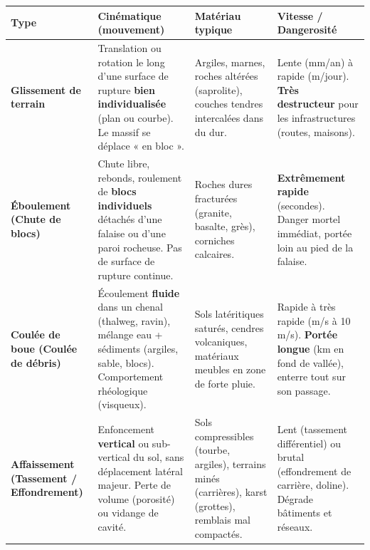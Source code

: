 \documentclass[11pt]{article}
\begin{document}
\begin{propriete}
\begin{center}
\begin{tabularx}{\linewidth}{|l|X|X|X|}\hline
\rowcolor{popblueL}
\textbf{Type} & \textbf{Cinématique (mouvement)} & \textbf{Matériau typique} & \textbf{Vitesse / Dangerosité} \\ \hline
\textbf{Glissement de terrain} & Translation ou rotation le long d'une surface de rupture \textbf{bien individualisée} (plan ou courbe). Le massif se déplace « en bloc ». & Argiles, marnes, roches altérées (saprolite), couches tendres intercalées dans du dur. & Lente (mm/an) à rapide (m/jour). \textbf{Très destructeur} pour les infrastructures (routes, maisons). \\ \hline
\textbf{Éboulement (Chute de blocs)} & Chute libre, rebonds, roulement de \textbf{blocs individuels} détachés d'une falaise ou d'une paroi rocheuse. Pas de surface de rupture continue. & Roches dures fracturées (granite, basalte, grès), corniches calcaires. & \textbf{Extrêmement rapide} (secondes). Danger mortel immédiat, portée loin au pied de la falaise. \\ \hline
\textbf{Coulée de boue (Coulée de débris)} & Écoulement \textbf{fluide} dans un chenal (thalweg, ravin), mélange eau + sédiments (argiles, sable, blocs). Comportement rhéologique (visqueux). & Sols latéritiques saturés, cendres volcaniques, matériaux meubles en zone de forte pluie. & Rapide à très rapide (m/s à 10 m/s). \textbf{Portée longue} (km en fond de vallée), enterre tout sur son passage. \\ \hline
\textbf{Affaissement (Tassement / Effondrement)} & Enfoncement \textbf{vertical} ou sub-vertical du sol, sans déplacement latéral majeur. Perte de volume (porosité) ou vidange de cavité. & Sols compressibles (tourbe, argiles), terrains minés (carrières), karst (grottes), remblais mal compactés. & Lent (tassement différentiel) ou brutal (effondrement de carrière, doline). Dégrade bâtiments et réseaux. \\ \hline
\end{tabularx}
\end{center}
\end{propriete}
\end{document}
